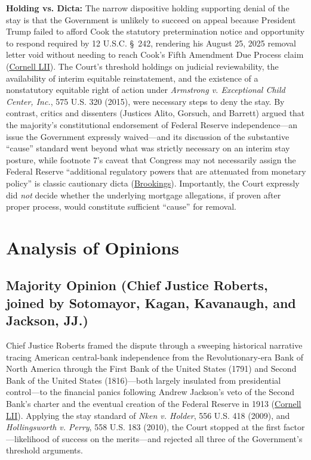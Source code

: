 \documentclass[12pt]{article}
\begin{document}
\textbf{Holding vs. Dicta:} The narrow dispositive holding supporting denial of the stay is that the Government is unlikely to succeed on appeal because President Trump failed to afford Cook the statutory pretermination notice and opportunity to respond required by 12 U.S.C. \S~242, rendering his August 25, 2025 removal letter void without needing to reach Cook's Fifth Amendment Due Process claim (\href{https://www.law.cornell.edu/supremecourt/text/25A312}{Cornell LII}). The Court's threshold holdings on judicial reviewability, the availability of interim equitable reinstatement, and the existence of a nonstatutory equitable right of action under \textit{Armstrong v. Exceptional Child Center, Inc.}, 575 U.S. 320 (2015), were necessary steps to deny the stay. By contrast, critics and dissenters (Justices Alito, Gorsuch, and Barrett) argued that the majority's constitutional endorsement of Federal Reserve independence---an issue the Government expressly waived---and its discussion of the substantive ``cause'' standard went beyond what was strictly necessary on an interim stay posture, while footnote 7's caveat that Congress may not necessarily assign the Federal Reserve ``additional regulatory powers that are attenuated from monetary policy'' is classic cautionary dicta (\href{https://www.brookings.edu/articles/fed-independence-after-trump-v-cook/}{Brookings}). Importantly, the Court expressly did \emph{not} decide whether the underlying mortgage allegations, if proven after proper process, would constitute sufficient ``cause'' for removal.

\section{Analysis of Opinions}

\subsection{Majority Opinion (Chief Justice Roberts, joined by Sotomayor, Kagan, Kavanaugh, and Jackson, JJ.)}

Chief Justice Roberts framed the dispute through a sweeping historical narrative tracing American central-bank independence from the Revolutionary-era Bank of North America through the First Bank of the United States (1791) and Second Bank of the United States (1816)---both largely insulated from presidential control---to the financial panics following Andrew Jackson's veto of the Second Bank's charter and the eventual creation of the Federal Reserve in 1913 (\href{https://www.law.cornell.edu/supremecourt/text/25A312}{Cornell LII}). Applying the stay standard of \textit{Nken v. Holder}, 556 U.S. 418 (2009), and \textit{Hollingsworth v. Perry}, 558 U.S. 183 (2010), the Court stopped at the first factor---likelihood of success on the merits---and rejected all three of the Government's threshold arguments.
\end{document}
